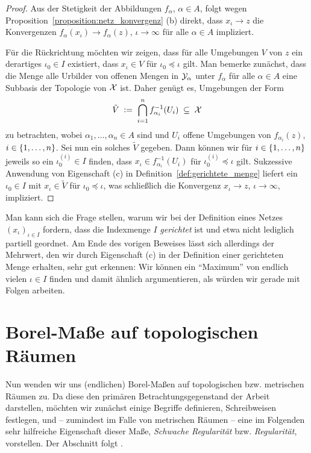 \documentclass[../thesis/thesis.tex]{subfiles}
\begin{document}
	\begin{proof}
		Aus der Stetigkeit der Abbildungen $f_\alpha$, $\alpha \in A$, folgt wegen Proposition~\ref{proposition:netz_konvergenz} (b) direkt, dass $x_{\iota} \to z$ die Konvergenzen 
		$f_\alpha(x_\iota) \to f_\alpha(z)$, $\iota \to \infty$ für alle $\alpha \in A$ impliziert.
		
		Für die Rückrichtung möchten wir zeigen, dass für alle Umgebungen $V$ von $z$ ein derartiges $\iota_0 \in I$ existiert, dass $x_\iota \in V$ für $\iota_0 \preceq \iota$ gilt.
		Man bemerke zunächst, dass die Menge alle Urbilder von offenen Mengen in $\mathcal{Y}_\alpha$ unter $f_\alpha$ für alle $\alpha \in A$ eine Subbasis der Topologie von $\mathcal{X}$ ist.
		Daher genügt es, Umgebungen der Form
		\[ \tilde{V} \; \vcentcolon = \; \bigcap_{i=1}^{n} f_{\alpha_i}^{-1}(U_i) \; \subseteq \; \mathcal{X} \]
		zu betrachten, wobei $\alpha_1, \dots, \alpha_n \in A$ sind und $U_i$ offene Umgebungen von $f_{\alpha_i}(z)$, $i \in \left\{1, \dots, n\right\}$.
		Sei nun ein solches $\tilde{V}$ gegeben. Dann können wir für $i \in \left\{1, \dots, n\right\}$ jeweils so ein $\iota_0^{(i)} \in I$ finden, dass $x_\iota \in f_{\alpha_i}^{-1}(U_i)$ für 
		$\iota_0^{(i)} \preceq \iota$ gilt. Sukzessive Anwendung von Eigenschaft (c) in Definition~\ref{def:gerichtete_menge} liefert ein $\iota_0 \in I$ mit 
		$x_\iota \in \tilde{V}$ für $\iota_0 \preceq \iota$, was schließlich die Konvergenz $x_\iota \to z$, $\iota \to \infty$, impliziert.
	\end{proof}

	\begin{Bemerkung}
		Man kann sich die Frage stellen, warum wir bei der Definition eines Netzes $(x_\iota)_{\iota \in I}$ fordern, dass die Indexmenge $I$ \emph{gerichtet} ist und etwa nicht lediglich
		partiell geordnet. Am Ende des vorigen Beweises lässt sich allerdings der Mehrwert, den wir durch Eigenschaft (c) in der Definition einer gerichteten Menge erhalten, sehr gut erkennen: 
		Wir können ein \enquote{Maximum} 
		von endlich vielen $\iota \in I$ finden und damit ähnlich argumentieren, als würden wir gerade mit Folgen arbeiten.
	\end{Bemerkung}
	
	\section{Borel-Maße auf topologischen Räumen}
	\label{subsec:borel-maße_auf_topologischen_räumen}
	
	Nun wenden wir uns (endlichen) Borel-Maßen auf topologischen bzw. metrischen Räumen zu. Da diese den primären Betrachtungsgegenstand der
	Arbeit darstellen, möchten wir zunächst einige Begriffe definieren, Schreibweisen festlegen, und -- zumindest im Falle von metrischen Räumen -- eine im Folgenden sehr 
	hilfreiche Eigenschaft dieser Maße, \emph{Schwache Regularität} bzw. \emph{Regularität}, vorstellen.
	Der Abschnitt folgt \cite[Section 4.14]{Simon.2015}.
	
\end{document}
